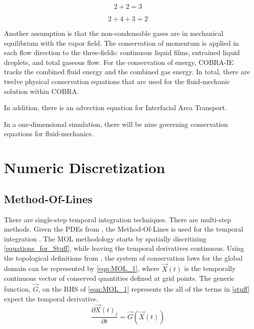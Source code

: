 \begin{equation}
\label{eqn:conservation_of_liq_energy}
2 + 2 = 3
\end{equation}

\begin{equation}
\label{eqn:conservation_of_gas_energy}
2 + 4  + 3 = 2
\end{equation}

Another assumption is that the non-condensable gases are in mechanical equilibrium with the vapor field.
The conservation of momentum is applied in each flow direction to the three-fields: continuous liquid films, entrained liquid droplets, and total gaseous flow.
For the conservation of energy, COBRA-IE tracks the combined fluid energy and the combined gas energy.
In total, there are twelve physical conservation equations that are used for the fluid-mechanic solution within COBRA.

In addition, there is an advection equation for Interfacial Area Transport.

In a one-dimensional simulation, there will be nine governing conservation equations for fluid-mechanics.

\section{Numeric Discretization}
\label{sect:numeric_methods}

\subsection{Method-Of-Lines}
\label{subsect:numerics_explicit}
There are single-step temporal integration techniques.
There are multi-step methods.
Given the PDEs from , the Method-Of-Lines is used for the temporal integration \cite{LeVeque2007}.
The MOL methodology starts by spatially discritizing \eqref{equations_for_Stuff}, while leaving the temporal derivatives continuous.
Using the topological definitions from , the system of conservation laws for the global domain can be represented by \eqref{eqn:MOL_1}, where $\vec{X}(t)$ is the temporally continuous vector of conserved quantities defined at grid points.
The generic function, $\vec{G}$, on the RHS of \eqref{eqn:MOL_1} represents the all of the terms in \eqref{stuff} expect the temporal derivative.
\begin{equation}
\label{eqn:MOL_1}
\frac{\partial \vec{X}(t)_j}{\partial t} = \vec{G}(\vec{X}(t))
\end{equation}

